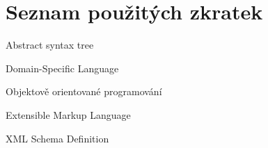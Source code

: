 \usepackage[T1]{fontenc}
\usepackage[utf8]{inputenc}


\chapter{Seznam použitých zkratek}

\begin{description}[align=left]
    \item [AST] Abstract syntax tree
    \item [DSL] Domain-Specific Language
    \item [OOP] Objektově orientované programování
    \item [XML] Extensible Markup Language
    \item [XSD] XML Schema Definition
\end{description}
